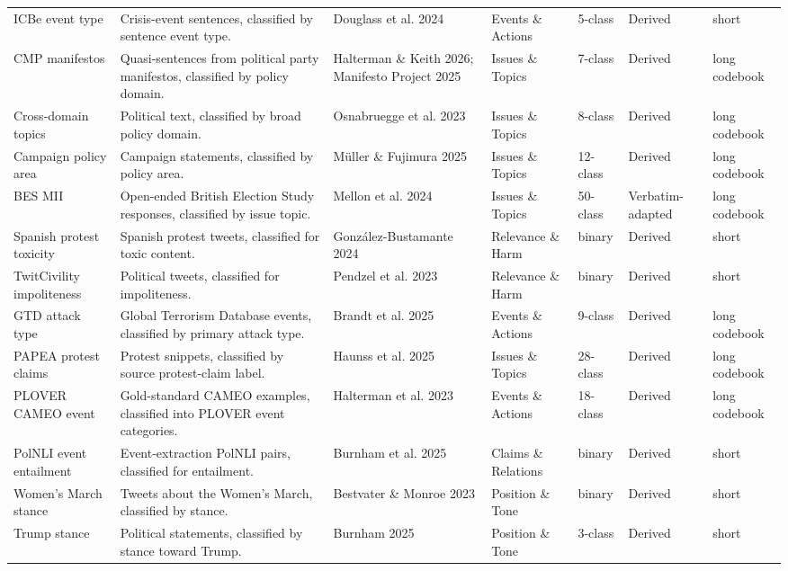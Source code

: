 \begin{longtable}[t]{l>{\raggedright\arraybackslash}p{18em}>{\raggedright\arraybackslash}p{7em}>{\raggedright\arraybackslash}p{8em}lll}
ICBe event type & Crisis-event sentences, classified by sentence event type. & Douglass et al. 2024 & Events \& Actions & 5-class & Derived & short\\
CMP manifestos & Quasi-sentences from political party manifestos, classified by policy domain. & Halterman \& Keith 2026; Manifesto Project 2025 & Issues \& Topics & 7-class & Derived & long codebook\\
\addlinespace
Cross-domain topics & Political text, classified by broad policy domain. & Osnabruegge et al. 2023 & Issues \& Topics & 8-class & Derived & long codebook\\
Campaign policy area & Campaign statements, classified by policy area. & Müller \& Fujimura 2025 & Issues \& Topics & 12-class & Derived & long codebook\\
BES MII & Open-ended British Election Study responses, classified by issue topic. & Mellon et al. 2024 & Issues \& Topics & 50-class & Verbatim-adapted & long codebook\\
Spanish protest toxicity & Spanish protest tweets, classified for toxic content. & González-Bustamante 2024 & Relevance \& Harm & binary & Derived & short\\
TwitCivility impoliteness & Political tweets, classified for impoliteness. & Pendzel et al. 2023 & Relevance \& Harm & binary & Derived & short\\
\addlinespace
GTD attack type & Global Terrorism Database events, classified by primary attack type. & Brandt et al. 2025 & Events \& Actions & 9-class & Derived & long codebook\\
PAPEA protest claims & Protest snippets, classified by source protest-claim label. & Haunss et al. 2025 & Issues \& Topics & 28-class & Derived & long codebook\\
PLOVER CAMEO event & Gold-standard CAMEO examples, classified into PLOVER event categories. & Halterman et al. 2023 & Events \& Actions & 18-class & Derived & long codebook\\
PolNLI event entailment & Event-extraction PolNLI pairs, classified for entailment. & Burnham et al. 2025 & Claims \& Relations & binary & Derived & short\\
Women's March stance & Tweets about the Women's March, classified by stance. & Bestvater \& Monroe 2023 & Position \& Tone & binary & Derived & short\\
\addlinespace
Trump stance & Political statements, classified by stance toward Trump. & Burnham 2025 & Position \& Tone & 3-class & Derived & short\\

\end{longtable}
